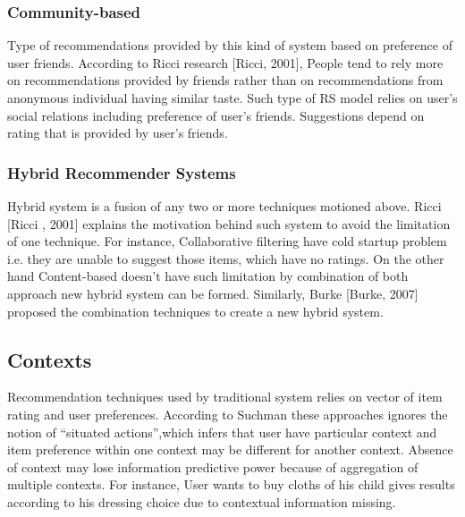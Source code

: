 \subsubsection{Community-based}

Type of recommendations provided by this kind of system based on preference of user friends. According to Ricci research [Ricci, 2001], People tend to rely more on recommendations provided by friends rather than on recommendations from anonymous individual having similar taste. Such type of RS model relies on user’s social relations including preference of user’s friends. Suggestions depend on rating that is provided by user’s friends.

\subsubsection{Hybrid Recommender Systems}

Hybrid system is a fusion of any two or more techniques motioned above. Ricci [Ricci , 2001] explains the motivation behind such system to avoid the limitation of one technique. For instance, Collaborative filtering have cold startup problem i.e. they are unable to suggest those items, which have no ratings. On the other hand Content-based doesn’t have such limitation by combination of both approach new hybrid system can be formed. Similarly, Burke [Burke, 2007] proposed the combination techniques to create a new hybrid system.

\subsection{Contexts}
Recommendation techniques used by traditional system relies on vector of item rating and user preferences. According to Suchman \cite[Suchman, 1996]{suchman1986plans} these approaches ignores the notion of “situated actions”,which infers that user have particular context and item preference within one context may be different for another context\cite[Adomavicius, 2011]{adomavicius2011context}.
Absence of context may lose information predictive power because of aggregation of multiple contexts. For instance, User wants to buy cloths of his child gives results according to his dressing choice due to contextual information missing.\newline


